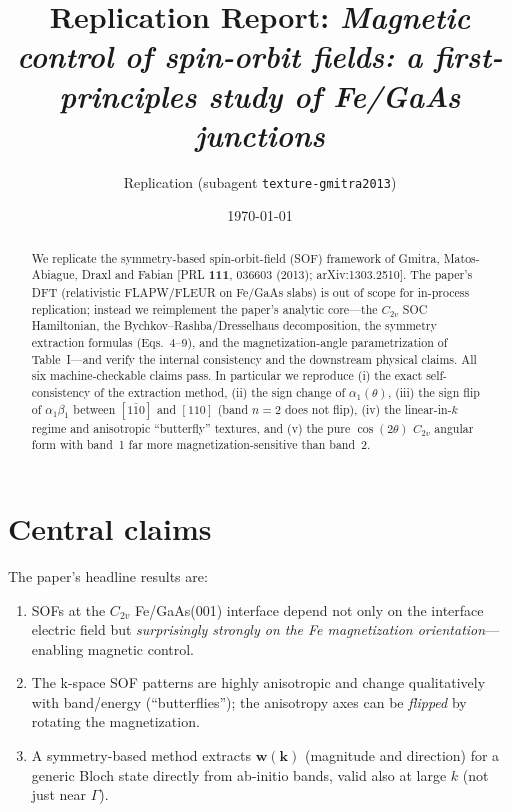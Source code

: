 \documentclass[aps,prl,twocolumn,superscriptaddress]{revtex4-2}
\begin{document}
\title{Replication Report: \emph{Magnetic control of spin-orbit fields:
a first-principles study of Fe/GaAs junctions}}
\author{Replication (subagent \texttt{texture-gmitra2013})}
\date{\today}

\begin{abstract}
We replicate the symmetry-based spin-orbit-field (SOF) framework of Gmitra,
Matos-Abiague, Draxl and Fabian [PRL \textbf{111}, 036603 (2013);
arXiv:1303.2510]. The paper's DFT (relativistic FLAPW/FLEUR on Fe/GaAs slabs) is
out of scope for in-process replication; instead we reimplement the paper's
analytic core---the $C_{2v}$ SOC Hamiltonian, the Bychkov--Rashba/Dresselhaus
decomposition, the symmetry extraction formulas (Eqs.~4--9), and the
magnetization-angle parametrization of Table~I---and verify the internal
consistency and the downstream physical claims. All six machine-checkable claims
pass. In particular we reproduce (i) the exact self-consistency of the extraction
method, (ii) the sign change of $\alpha_1(\theta)$, (iii) the sign flip of
$\alpha_1\beta_1$ between $[1\bar10]$ and $[110]$ (band $n{=}2$ does not flip),
(iv) the linear-in-$k$ regime and anisotropic ``butterfly'' textures, and
(v) the pure $\cos(2\theta)$ $C_{2v}$ angular form with band~1 far more
magnetization-sensitive than band~2.
\end{abstract}
\maketitle

\section{Central claims}
The paper's headline results are:
\begin{enumerate}
\item SOFs at the $C_{2v}$ Fe/GaAs(001) interface depend not only on the
interface electric field but \emph{surprisingly strongly on the Fe
magnetization orientation}---enabling magnetic control.
\item The k-space SOF patterns are highly anisotropic and change qualitatively
with band/energy (``butterflies''); the anisotropy axes can be \emph{flipped}
by rotating the magnetization.
\item A symmetry-based method extracts $\mathbf{w}(\mathbf{k})$ (magnitude and
direction) for a generic Bloch state directly from ab-initio bands, valid also
at large $k$ (not just near $\Gamma$).
\end{enumerate}
\end{document}
